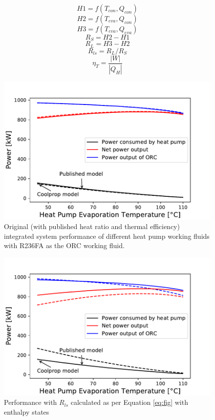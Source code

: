 \documentclass[a4paper,12pt]{article}
\begin{document}
\begin{equation}
    H1 = f(T_{con},Q_{con})
\end{equation}
\begin{equation}
    H2 = f(T_{eva},Q_{con})
\end{equation}
\begin{equation}
    H3 = f(T_{eva},Q_{eva})
\end{equation}
\begin{equation}
    R_S = H2 - H1
\end{equation}
\begin{equation}
    R_L = H3 - H2
\end{equation}
\begin{equation}
    R_{ls} = R_L/R_S
    \label{eq:fig}
\end{equation}
\begin{equation}
    \label{eq:ThermalEffec1}
    \eta_T = \frac{|W|}{|Q_H|}
\end{equation}
\begin{figure}[H]
  \centering
  \includegraphics[scale = 0.65]{Images/Int_R236FA.pdf}
  \caption{Original (with published heat ratio and thermal efficiency) integrated system performance of different heat pump working fluids with R236FA as the ORC working fluid.}\label{fig:Int}
\end{figure}
\begin{figure}[H]
  \centering
  \includegraphics[scale = 0.65]{Images/Int_R236FA_rls.pdf}
  \caption{Performance with $R_{ls}$ calculated as per Equation \ref{eq:fig} with enthalpy states}\label{fig:Int_rls}
\end{figure}
\end{document}
